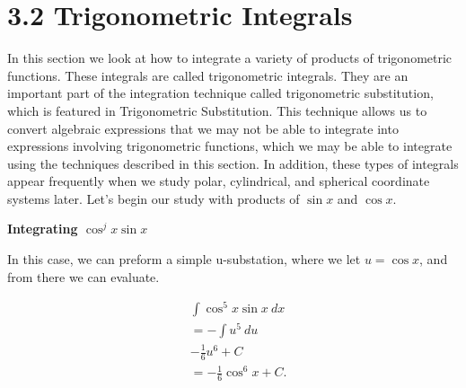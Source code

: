 \documentclass{report}
\begin{document}
        \pagebreak 
        \section*{3.2 Trigonometric Integrals}
        \bigbreak \noindent 
        In this section we look at how to integrate a variety of products of trigonometric functions. These integrals are called trigonometric integrals. They are an important part of the integration technique called trigonometric substitution, which is featured in Trigonometric Substitution. This technique allows us to convert algebraic expressions that we may not be able to integrate into expressions involving trigonometric functions, which we may be able to integrate using the techniques described in this section. In addition, these types of integrals appear frequently when we study polar, cylindrical, and spherical coordinate systems later. Let’s begin our study with products of $\sin{x}$ and $\cos{x}$.

        \bigbreak \noindent 
        \begin{large}
            \textbf{Integrating $\cos^{j}{x}\sin{x}$}
        \end{large}
        \bigbreak \noindent 
        In this case, we can preform a simple u-substation, where we let $u=\cos{x}$, and from there we can evaluate.
        \bigbreak \noindent 
        \begin{eg}[Evaluate]
           \begin{align*}
               &\int \cos^{5}{x}\sin{x}\ dx \\
               &=- \int u^{5}\ du \\
               &-\frac{1}{6}u^{6} + C \\
               &= -\frac{1}{6}\cos^{6}{x} + C
           .\end{align*} 
        \end{eg}
        
\end{document}

